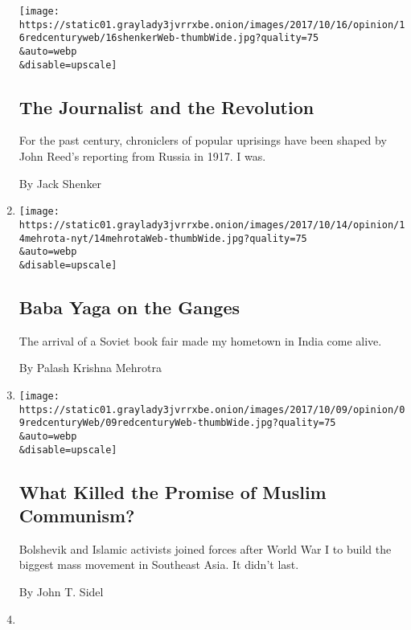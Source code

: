 \begin{enumerate}
  \texttt{[image: https://static01.graylady3jvrrxbe.onion/images/2017/10/16/opinion/16redcenturyweb/16shenkerWeb-thumbWide.jpg?quality=75\\\&auto=webp\\\&disable=upscale]}

  \hypertarget{the-journalist-and-the-revolution}{%
  \subsection{The Journalist and the
  Revolution}\label{the-journalist-and-the-revolution}}

  For the past century, chroniclers of popular uprisings have been
  shaped by John Reed's reporting from Russia in 1917. I was.

  By Jack Shenker
\item
  \href{/2017/10/14/opinion/india-soviet-union-books.html}{}

  \texttt{[image: https://static01.graylady3jvrrxbe.onion/images/2017/10/14/opinion/14mehrota-nyt/14mehrotaWeb-thumbWide.jpg?quality=75\\\&auto=webp\\\&disable=upscale]}

  \hypertarget{baba-yaga-on-the-ganges}{%
  \subsection{Baba Yaga on the Ganges}\label{baba-yaga-on-the-ganges}}

  The arrival of a Soviet book fair made my hometown in India come
  alive.

  By Palash Krishna Mehrotra
\item
  \href{/2017/10/09/opinion/muslim-communism.html}{}

  \texttt{[image: https://static01.graylady3jvrrxbe.onion/images/2017/10/09/opinion/09redcenturyWeb/09redcenturyWeb-thumbWide.jpg?quality=75\\\&auto=webp\\\&disable=upscale]}

  \hypertarget{what-killed-the-promise-of-muslim-communism}{%
  \subsection{What Killed the Promise of Muslim
  Communism?}\label{what-killed-the-promise-of-muslim-communism}}

  Bolshevik and Islamic activists joined forces after World War I to
  build the biggest mass movement in Southeast Asia. It didn't last.

  By John T. Sidel
\item
  \href{/2017/10/02/opinion/the-communist-partys-party-people.html}{}


\end{enumerate}

